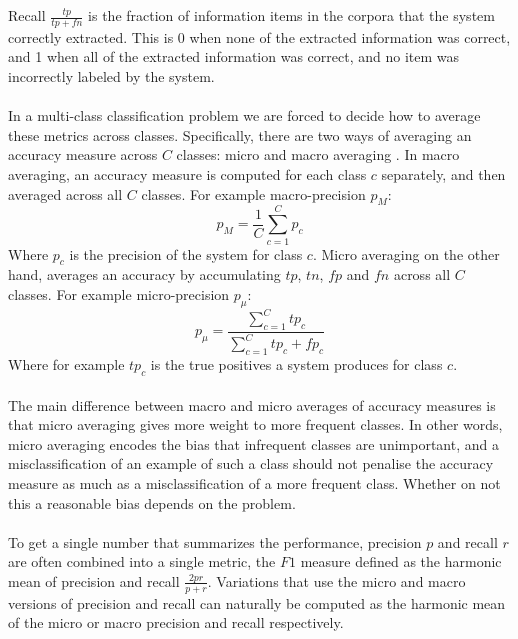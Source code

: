 Recall $\frac{tp}{tp + fn}$ is the fraction of information items in the corpora that the system correctly extracted. This is 0 when none of the extracted information was correct, and 1 when all of the extracted information was correct, and no item was incorrectly labeled by the system.
\\\\
In a multi-class classification problem we are forced to decide how to average these metrics across classes. Specifically, there are two ways of averaging an accuracy measure across $C$ classes: micro and macro averaging \citep{sokolova2009}. In macro averaging, an accuracy measure is computed for each class $c$ separately, and then averaged across all $C$ classes. For example macro-precision $p_{M}$:
$$
p_{M} = \frac{1}{C}\sum_{c=1}^C p_c
$$
Where $p_c$ is the precision of the system for class $c$. Micro averaging on the other hand, averages an accuracy by accumulating $tp$, $tn$, $fp$ and $fn$ across all $C$ classes. For example micro-precision $p_{\mu}$:
$$
p_\mu = \frac{\sum\limits_{c=1}^C tp_c}{\sum\limits_{c=1}^C tp_c + fp_c}
$$
Where for example $tp_c$ is the true positives a system produces for class $c$.
\\\\
The main difference between macro and micro averages of accuracy measures is that micro averaging gives more weight to more frequent classes. In other words, micro averaging encodes the bias that infrequent classes are unimportant, and a misclassification of an example of such a class should not penalise the accuracy measure as much as a misclassification of a more frequent class. Whether on not this a reasonable bias depends on the problem.
\\\\
To get a single number that summarizes the performance, precision $p$ and recall $r$ are often combined into a single metric, the $F1$ measure defined as the harmonic mean of precision and recall $\frac{2pr}{p + r}$. Variations that use the micro and macro versions of precision and recall can naturally be computed as the harmonic mean of the micro or macro precision and recall respectively.